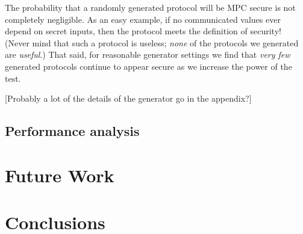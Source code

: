 \documentclass[conference]{IEEEtran}
\begin{document}
The probability that a randomly generated protocol will be MPC secure is not completely negligible.
As an easy example, if no communicated values ever depend on secret inputs, then the protocol meets the definition of security!
(Never mind that such a protocol is useless; \textit{none} of the protocols we generated are \textit{useful}.)
That said, for reasonable generator settings we find that \textit{very few} generated protocols
continue to appear secure as we increase the power of the test.

[Probably a lot of the details of the generator go in the appendix?]

\subsection{Performance analysis}


\section{Future Work}


\section{Conclusions}
\end{document}
